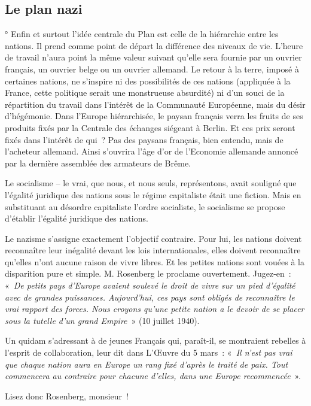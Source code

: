 \documentclass[french,twoside]{book} %
\begin{document}
\subsection[Le plan nazi]{Le plan nazi}
° Enfin et surtout l’idée centrale du Plan est celle de la hiérarchie entre les nations. Il prend comme point de départ la différence des niveaux de vie. L’heure de travail n’aura point la même valeur suivant qu’elle sera fournie par un ouvrier français, un ouvrier belge ou un ouvrier allemand. Le retour à la terre, imposé à certaines nations, ne s’inspire ni des possibilités de ces nations (appliquée à la France, cette politique serait une monstrueuse absurdité) ni d’un souci de la répartition du travail dans l’intérêt de la Communauté Européenne, mais du désir d’hégémonie. Dans l’Europe hiérarchisée, le paysan français verra les fruits de ses produits fixés par la Centrale des échanges siégeant à Berlin. Et ces prix seront fixés dans l’intérêt de qui ? Pas des paysans français, bien entendu, mais de l’acheteur allemand. Ainsi s’ouvrira l’âge d’or de l’Economie allemande annoncé par la dernière assemblée des armateurs de Brême.\par
Le socialisme – le vrai, que nous, et nous seuls, représentons, avait souligné que l’égalité juridique des nations sous le régime capitaliste était une fiction. Mais en substituant au désordre capitaliste l’ordre socialiste, le socialisme se propose d’établir l’égalité juridique des nations.\par
Le nazisme s’assigne exactement l’objectif contraire. Pour lui, les nations doivent reconnaître leur inégalité devant les lois internationales, elles doivent reconnaître qu’elles n’ont aucune raison de vivre libres. Et les petites nations sont vouées à la disparition pure et simple. M. Rosenberg le proclame ouvertement. Jugez-en : « \emph{De petits pays d’Europe avaient soulevé le droit de vivre sur un pied d’égalité avec de grandes puissances. Aujourd’hui, ces pays sont obligés de reconnaître le vrai rapport des forces. Nous croyons qu’une petite nation a le devoir de se placer sous la tutelle d’un grand Empire} » (10 juillet 1940).\par
Un quidam s’adressant à de jeunes Français qui, paraît-il, se montraient rebelles à l’esprit de collaboration, leur dit dans L’Œuvre du 5 mars : « \emph{Il n’est pas vrai que chaque nation aura en Europe un rang fixé d’après le traité de paix. Tout commencera au contraire pour chacune d’elles, dans une Europe recommencée} ».\par
Lisez donc Rosenberg, monsieur !
\end{document}
